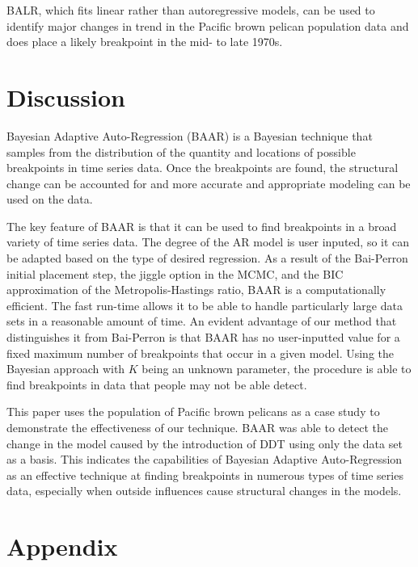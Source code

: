 \documentclass[submit]{smj}
\begin{document}
	BALR, which fits linear rather than autoregressive models, can be used to identify major changes in trend in the Pacific brown pelican population data and does place a likely breakpoint in the mid- to late 1970s.


\section{Discussion}
	Bayesian Adaptive Auto-Regression (BAAR) is a Bayesian technique that samples from the distribution of the quantity and locations of possible breakpoints in time series data. Once the breakpoints are found, the structural change can be accounted for and more accurate and appropriate modeling can be used on the data. 
	
	The key feature of BAAR is that it can be used to find breakpoints in a broad variety of time series data. The degree of the AR model is user inputed, so it can be adapted based on the type of desired regression. As a result of the Bai-Perron initial placement step, the jiggle option in the MCMC, and the BIC approximation of the Metropolis-Hastings ratio, BAAR is a computationally efficient. The fast run-time allows it to be able to handle particularly large data sets in a reasonable amount of time. An evident advantage of our method that distinguishes it from Bai-Perron is that BAAR has no user-inputted value for a fixed maximum number of breakpoints that occur in a given model. Using the Bayesian approach with $K$ being an unknown parameter, the procedure is able to find breakpoints in data that people may not be able detect. 
	
	This paper uses the population of Pacific brown pelicans as a case study to demonstrate the effectiveness of our technique. BAAR was able to detect the change in the model caused by the introduction of DDT using only the data set as a basis. This indicates the capabilities of Bayesian Adaptive Auto-Regression as an effective technique at finding breakpoints in numerous types of time series data, especially when outside influences cause structural changes in the models. 

\section{Appendix}
\end{document}
